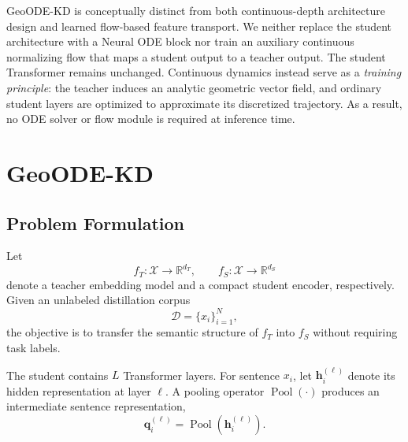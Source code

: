 \documentclass[11pt]{article}
\begin{document}
GeoODE-KD is conceptually distinct from both continuous-depth architecture
design and learned flow-based feature transport. We neither replace the
student architecture with a Neural ODE block nor train an auxiliary
continuous normalizing flow that maps a student output to a teacher output.
The student Transformer remains unchanged. Continuous dynamics instead
serve as a \emph{training principle}: the teacher induces an analytic
geometric vector field, and ordinary student layers are optimized to
approximate its discretized trajectory. As a result, no ODE solver or
flow module is required at inference time.



\section{GeoODE-KD}\label{sec:method}

\subsection{Problem Formulation}\label{sec:problem}

Let
\begin{equation}
    f_T : \mathcal{X}\rightarrow\mathbb{R}^{d_T},
    \qquad
    f_S : \mathcal{X}\rightarrow\mathbb{R}^{d_S}
\end{equation}
denote a teacher embedding model and a compact student encoder,
respectively. Given an unlabeled distillation corpus
\begin{equation}
    \mathcal{D}={\bigl\{x_i\bigr\}}_{i=1}^{N},
\end{equation}
the objective is to transfer the semantic structure of $f_T$ into $f_S$
without requiring task labels.

The student contains $L$ Transformer layers. For sentence $x_i$, let
$\mathbf{h}^{(\ell)}_i$ denote its hidden representation at layer $\ell$.
A pooling operator $\operatorname{Pool}(\cdot)$ produces an intermediate
sentence representation,
\begin{equation}
    \mathbf{q}^{(\ell)}_i
    =
    \operatorname{Pool}
    \left(
        \mathbf{h}^{(\ell)}_i
    \right).
\end{equation}
\end{document}
